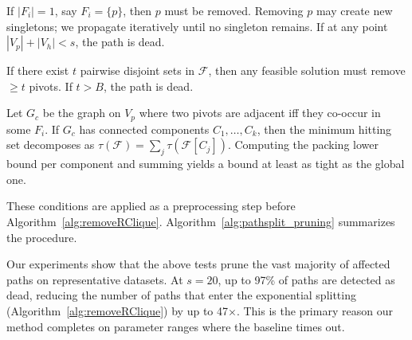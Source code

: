 \begin{lemma}\label{lem:singleton}
If $|F_i| = 1$, say $F_i = \{p\}$, then $p$ must be removed.
Removing $p$ may create new singletons; we propagate iteratively until no singleton remains.
If at any point $|V_p| + |V_h| < s$, the path is dead.
\end{lemma}

\begin{lemma}\label{lem:packing}
If there exist $t$ pairwise disjoint sets in $\mathcal{F}$, then any feasible solution must remove $\ge t$ pivots.
If $t > B$, the path is dead.
\end{lemma}

\begin{lemma}\label{lem:component_lb}
Let $G_c$ be the graph on $V_p$ where two pivots are adjacent iff they co-occur in some $F_i$.
If $G_c$ has connected components $C_1, \dots, C_k$, then the minimum hitting set decomposes as $\tau(\mathcal{F}) = \sum_j \tau(\mathcal{F}[C_j])$.
Computing the packing lower bound per component and summing yields a bound at least as tight as the global one.
\end{lemma}

These conditions are applied as a preprocessing step before Algorithm~\ref{alg:removeRClique}.
Algorithm~\ref{alg:pathsplit_pruning} summarizes the procedure.



Our experiments show that the above tests prune the vast majority of affected paths on representative datasets.
At $s = 20$, up to 97\% of paths are detected as dead, reducing the number of paths that enter the exponential splitting (Algorithm~\ref{alg:removeRClique}) by up to 47$\times$.
This is the primary reason our method completes on parameter ranges where the baseline times out.
